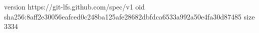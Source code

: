 version https://git-lfs.github.com/spec/v1
oid sha256:8aff2e30056eafced0c248ba125afe28682dbfdca6533a992a50e4fa30d87485
size 3334

